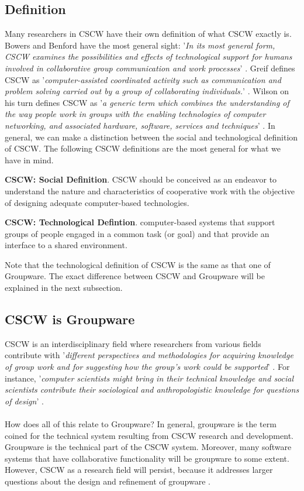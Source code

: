 \subsection{Definition}

Many researchers in CSCW have their own definition of what CSCW exactly is. Bowers and Benford have the most general sight: '\textit{In its most general form, CSCW examines the possibilities and effects of technological support for humans involved in collaborative group communication and work processes}' \cite{StudyCSCW}. Greif defines CSCW as '\textit{computer-assisted coordinated activity such as communication and problem solving carried out by a group of collaborating individuals.}' \cite{CSCWReadings}. Wilson on his turn defines CSCW as '\textit{a generic term which combines the understanding of the way people work in groups with the enabling technologies of computer networking, and associated hardware, software, services and techniques}' \cite{CSCWIntro}. In general, we can make a distinction between the social and technological definition of CSCW. The following CSCW definitions are the most general for what we have in mind.
\begin{mydef}
\textbf{CSCW: Social Definition}. CSCW should be conceived as an endeavor to understand the nature and characteristics of cooperative work with the objective of designing adequate computer-based technologies. \cite{CSCWChars}
\end{mydef}
\begin{mydef}
\textbf{CSCW: Technological Defintion}. computer-based systems that support groups of people engaged in a common task (or goal) and that provide an interface to a shared environment. \cite{groupware}
\end{mydef}
Note that the technological definition of CSCW is the same as that one of Groupware. The exact difference between CSCW and Groupware will be explained in the next subsection.

\subsection{CSCW is Groupware}

CSCW is an interdisciplinary field where researchers from various fields contribute with '\textit{different perspectives and methodologies for acquiring knowledge of group work and for suggesting how the group's work could be supported}' \cite{CSCWGroupware}. For instance, '\textit{computer scientists might bring in their technical knowledge and social scientists contribute their sociological and anthropologistic knowledge for questions of design}' \cite{CSCWMethodology}.
\\ \\
How does all of this relate to Groupware? In general, groupware is the term coined for the technical system resulting from CSCW research and development. Groupware is the technical part of the CSCW system. Moreover, many software systems that have collaborative functionality will be groupware to some extent. However, CSCW as a research field will persist, because it addresses larger questions about the design and refinement of groupware \cite{CSCWReadings}.

